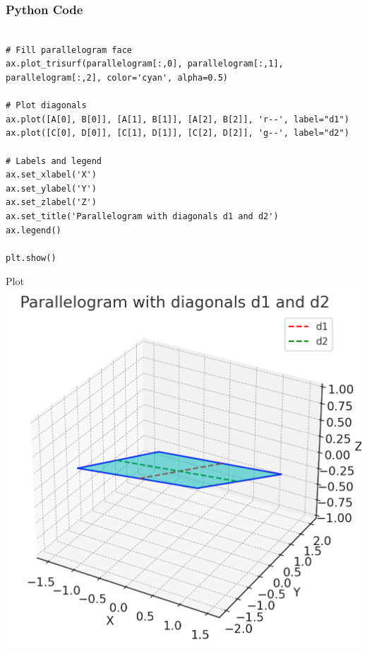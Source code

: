 \documentclass{beamer}
\begin{document}
\begin{frame}[fragile]
    \frametitle{Python Code}
    \begin{lstlisting}
    
# Fill parallelogram face
ax.plot_trisurf(parallelogram[:,0], parallelogram[:,1], parallelogram[:,2], color='cyan', alpha=0.5)

# Plot diagonals
ax.plot([A[0], B[0]], [A[1], B[1]], [A[2], B[2]], 'r--', label="d1")
ax.plot([C[0], D[0]], [C[1], D[1]], [C[2], D[2]], 'g--', label="d2")

# Labels and legend
ax.set_xlabel('X')
ax.set_ylabel('Y')
ax.set_zlabel('Z')
ax.set_title('Parallelogram with diagonals d1 and d2')
ax.legend()

plt.show()

    \end{lstlisting}
\end{frame}

\begin{frame}{Plot}
   \centering
   \includegraphics[width=\columnwidth, height=0.8\textheight, keepaspectratio]{beamer/figs/fig1.jpg}
   \label{fig:Beamer/figs/fig1.png}
\end{frame}
\end{document}
